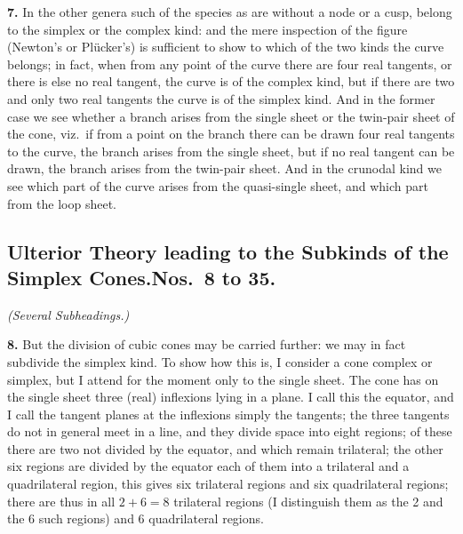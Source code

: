 \documentclass[11pt,a4paper]{article}
\begin{document}
\textbf{7.} In the other genera such of the species as are without a node or a cusp, belong to the simplex or the complex kind: and the mere inspection of the figure (Newton's or Pl\"ucker's) is sufficient to show to which of the two kinds the curve belongs; in fact, when from any point of the curve there are four real tangents, or there is else no real tangent, the curve is of the complex kind, but if there are two and only two real tangents the curve is of the simplex kind. And in the former case we see whether a branch arises from the single sheet or the twin-pair sheet of the cone, viz.\ if from a point on the branch there can be drawn four real tangents to the curve, the branch arises from the single sheet, but if no real tangent can be drawn, the branch arises from the twin-pair sheet. And in the crunodal kind we see which part of the curve arises from the quasi-single sheet, and which part from the loop sheet.

\subsection*{Ulterior Theory leading to the Subkinds of the Simplex Cones.\quad Nos.\ 8 to 35.}

\textit{(Several Subheadings.)}

\textbf{8.} But the division of cubic cones may be carried further: we may in fact subdivide the simplex kind. To show how this is, I consider a cone complex or simplex, but I attend for the moment only to the single sheet. The cone has on the single sheet three (real) inflexions lying in a plane. I call this the equator, and I call the tangent planes at the inflexions simply the tangents; the three tangents do not in general meet in a line, and they divide space into eight regions; of these there are two not divided by the equator, and which remain trilateral; the other six regions are divided by the equator each of them into a trilateral and a quadrilateral region, this gives six trilateral regions and six quadrilateral regions; there are thus in all $2+6=8$ trilateral regions (I distinguish them as the 2 and the 6 such regions) and 6 quadrilateral regions.
\end{document}
